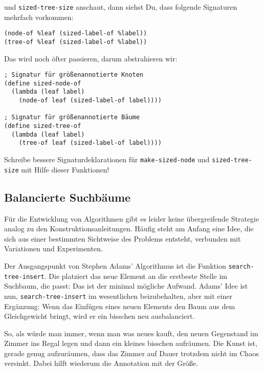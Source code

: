 und \lstinline{sized-tree-size} anschaut, dann siehst Du, dass
folgende Signaturen mehrfach vorkommen:
%
\begin{lstlisting}
(node-of %leaf (sized-label-of %label))
(tree-of %leaf (sized-label-of %label))
\end{lstlisting}
%
Das wird noch öfter passieren, darum abstrahieren wir:
%
\begin{lstlisting}
; Signatur für größenannotierte Knoten
(define sized-node-of
  (lambda (leaf label)
    (node-of leaf (sized-label-of label))))

; Signatur für größenannotierte Bäume
(define sized-tree-of
  (lambda (leaf label)
    (tree-of leaf (sized-label-of label))))
\end{lstlisting}
%
\begin{aufgabeinline}
  Schreibe bessere Signaturdeklarationen für
  \lstinline{make-sized-node} und \lstinline{sized-tree-size} mit
  Hilfe dieser Funktionen!
\end{aufgabeinline}
%

\subsection{Balancierte Suchbäume}

Für die Entwicklung von Algorithmen gibt es leider keine übergreifende
Strategie analog zu den Konstruktionsanleitungen. Häufig steht am
Anfang eine Idee, die sich aus einer bestimmten Sichtweise des
Problems entsteht, verbunden mit Variationen und Experimenten.

Der Ausgangspunkt von Stephen Adams' Algorithmus ist die Funktion
\lstinline{search-tree-insert}.  Die platziert das neue Element an die
erstbeste Stelle im Suchbaum, die passt: Das ist der minimal mögliche
Aufwand.  Adams' Idee ist nun, \lstinline{search-tree-insert} im
wesentlichen beizubehalten, aber mit einer Ergänzung: Wenn das
Einfügen eines neuen Elements den Baum aus dem Gleichgewicht bringt,
wird er ein bisschen neu ausbalanciert.

So, als würde man immer, wenn man was neues kauft, den neuen
Gegenstand im Zimmer ins Regal legen und dann ein kleines bisschen
aufräumen.  Die Kunst ist, gerade genug aufzuräumen, dass das Zimmer
auf Dauer trotzdem nicht im Chaos versinkt.  Dabei hilft wiederum die
Annotation mit der Größe.

